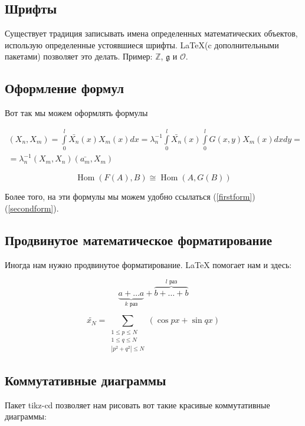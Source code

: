 \documentclass[a4paper,12pt]{article}
\let\leq\leqslant
\DeclareMathOperator{\Hom}{Hom}
\begin{document}
\subsection{Шрифты}

Существует традиция записывать имена определенных
математических объектов, использую определенные
устоявшиеся шрифты. \LaTeX (c дополнительными пакетами)
позволяет это делать. Пример: $\mathbb{Z}$, $\mathfrak{g}$ и $\mathcal{O}$.

\subsection{Оформление формул}

Вот так мы можем оформлять формулы

\begin{align}
    \label{firstform}
    (X_n, X_m) = \int\limits_0^l \bar{X_n}(x) X_m(x) dx = \lambda^{-1}_n \int \limits_0^l \bar{X_n}(x) \int \limits_0^l G(x, y) X_m(x) dx dy = \\
    = \lambda_n^{-1}(X_m, X_n)(\bar{a_m}, X_m)
\end{align}

\begin{equation}
    \label{secondform}
    \Hom(F(A), B) \cong \Hom(A, G(B))
\end{equation}

Более того, на эти формулы мы можем удобно ссылаться (\ref{firstform}) (\ref{secondform}).

\subsection{Продвинутое математическое форматирование}

Иногда нам нужно продвинутое форматирование. \LaTeX
помогает нам и здесь:

$$
\underbrace{a + \dots a}_{k \text{ раз}} + \overbrace{b + \dots + b}^{l \text{ раз}}
$$

$$
\widetilde{x_N} = \sum_{\substack{1 \leq p \leq N \\ 1 \leq q \leq N \\ | p^2 + q^2 | \leq N}} (\cos px + \sin qx)
$$

\subsection{Коммутативные диаграммы}

Пакет tikz-cd позволяет нам рисовать вот такие
красивые коммутативные диаграммы:
\end{document}
